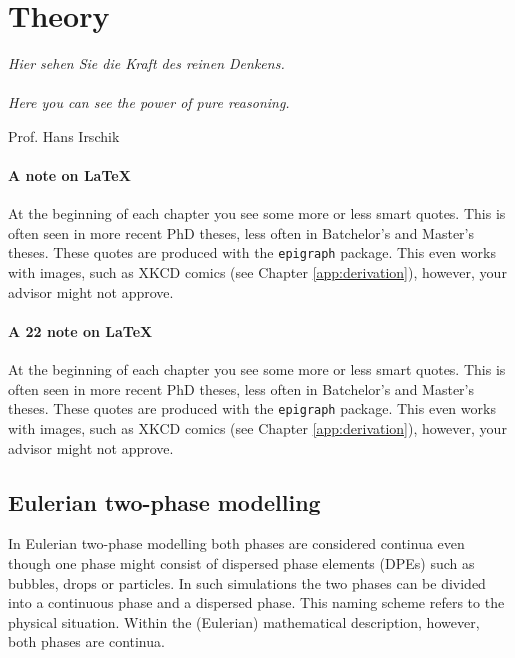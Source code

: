 \lipsum[1]

\chapter{Theory}
\label{sec:theory}

\epigraph{
	\textit{Hier sehen Sie die Kraft des reinen Denkens.} \\
	\hspace{1ex}\\
	\textit{Here you can see the power of pure reasoning.}
}{Prof. Hans Irschik}
		



\subsubsection*{A note on \LaTeX{}}

At the beginning of each chapter you see some more or less smart quotes. This is often seen 
in more recent PhD theses, less often in Batchelor's and Master's theses. These quotes are 
produced with the \verb+epigraph+ package. This even works with images, such as XKCD comics 
(see Chapter \ref{app:derivation}), however, your advisor might not approve.

\subsubsection*{A 22 note on \LaTeX{}}

At the beginning of each chapter you see some more or less smart quotes. This is often seen 
in more recent PhD theses, less often in Batchelor's and Master's theses. These quotes are 
produced with the \verb+epigraph+ package. This even works with images, such as XKCD comics 
(see Chapter \ref{app:derivation}), however, your advisor might not approve.

\section{Eulerian two-phase modelling}

In Eulerian two-phase modelling both phases are considered continua even though 
one phase might consist of dispersed phase elements (\acp{DPE}) such as bubbles, drops 
or particles. In such simulations the two phases can be divided into a 
continuous phase and a dispersed phase. This naming scheme refers to the physical 
situation. Within the (Eulerian) mathematical description, however, both phases 
are continua.



